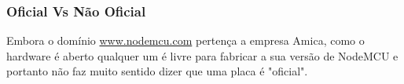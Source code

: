 \documentclass{beamer}
\begin{document}
\begin{frame}
\frametitle{Oficial Vs Não Oficial}
\begin{minipage}{\textwidth}
	
	Embora o domínio \url{www.nodemcu.com} pertença a empresa Amica, como o hardware é aberto qualquer um é livre para fabricar a sua versão de NodeMCU e portanto não faz muito sentido dizer que uma placa é "oficial". \cite{comparacao_placas_nodemcu} \cite{wemos}
	
	
	
	

\end{minipage}
\end{frame}
\end{document}
